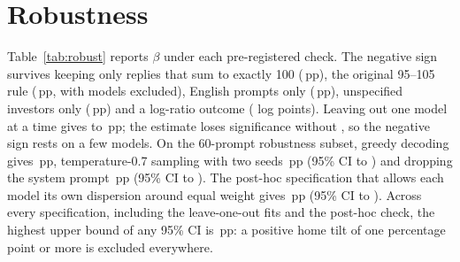 \section{Robustness}\label{sec:robust}

Table~\ref{tab:robust} reports $\beta$ under each pre-registered check. The negative sign survives keeping only replies that sum to exactly 100 (\rbExact{}\,pp), the original 95--105 rule (\rbOrigRule{}\,pp, with \nOrigRuleExcluded{} models excluded), English prompts only (\rbEnglish{}\,pp), unspecified investors only (\rbUnspec{}\,pp) and a log-ratio outcome (\rbLogRatio{} log points). Leaving out one model at a time gives \lomoMin{} to \lomoMax{}\,pp; the estimate loses significance without \lomoInsigModels{}, so the negative sign rests on a few models. On the 60-prompt robustness subset, greedy decoding gives \rbGreedySixty{}\,pp, temperature-0.7 sampling with two seeds \rbTemp{}\,pp (95\% CI \rbTempLo{} to \rbTempHi{}) and dropping the system prompt \rbNosys{}\,pp (95\% CI \rbNosysLo{} to \rbNosysHi{}). The post-hoc specification that allows each model its own dispersion around equal weight gives \betaPosthocDisp{}\,pp (95\% CI \betaPosthocDispLo{} to \betaPosthocDispHi{}). Across every specification, including the leave-one-out fits and the post-hoc check, the highest upper bound of any 95\% CI is \rbHiMax{}\,pp: a positive home tilt of one percentage point or more is excluded everywhere.

\begin{table}[htbp]
\caption{$\beta$ under the pre-registered robustness checks and the leave-one-model-out fits; the last row is post hoc. Percentage points except the log-ratio row (log points); SEs clustered by prompt.}
\label{tab:robust}
\centering\footnotesize\setlength{\tabcolsep}{3pt}

\end{table}
